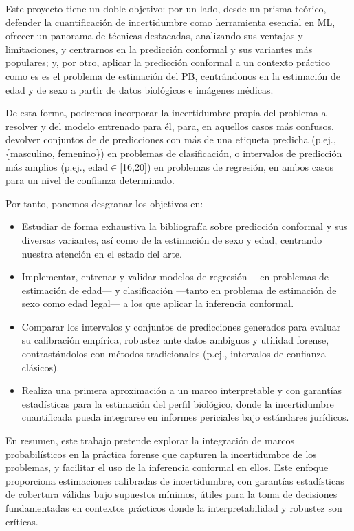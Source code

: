Este proyecto tiene un doble objetivo: por un lado, desde un prisma teórico, defender la cuantificación de
incertidumbre como herramienta esencial en ML, ofrecer un panorama de técnicas destacadas, analizando sus
ventajas y limitaciones, y centrarnos en la predicción conformal y sus variantes más populares; y, 
por otro, aplicar la predicción conformal a un contexto práctico como es es el problema de estimación del PB, 
centrándonos en la estimación de edad y de sexo a partir de datos biológicos e imágenes médicas. 

De esta forma, podremos incorporar la incertidumbre propia del problema a resolver y del modelo entrenado para 
él, para, en aquellos casos más confusos, devolver conjuntos de de predicciones con más de una etiqueta 
predicha (p.ej., \{masculino, femenino\}) en problemas de clasificación, o intervalos de predicción más 
amplios (p.ej., edad$\in$[16,20]) en problemas de regresión, en ambos casos para un nivel de confianza 
determinado.

Por tanto, ponemos desgranar los objetivos en:

\begin{itemize}

    \item Estudiar de forma exhaustiva la bibliografía sobre predicción conformal y sus diversas 
    variantes, así como de la estimación de sexo y edad, centrando nuestra atención en el estado del arte.

    \item Implementar, entrenar y validar modelos de regresión ---en problemas de estimación de edad--- y 
    clasificación ---tanto en problema de estimación de sexo como edad legal--- a los que aplicar la 
    inferencia conformal.

    \item Comparar los intervalos y conjuntos de predicciones generados para evaluar su calibración empírica, 
    robustez ante datos ambiguos y utilidad forense, contrastándolos con métodos tradicionales (p.ej., 
    intervalos de confianza clásicos).  

    \item Realiza una primera aproximación a un marco interpretable y con garantías estadísticas para la 
    estimación del perfil biológico, donde la incertidumbre cuantificada pueda integrarse en informes 
    periciales bajo estándares jurídicos.

\end{itemize}

En resumen, este trabajo pretende explorar la integración de marcos probabilísticos en la práctica forense
que capturen la incertidumbre de los problemas, y facilitar el uso de la inferencia conformal en ellos. 
Este enfoque proporciona estimaciones calibradas de incertidumbre, con garantías estadísticas de cobertura 
válidas bajo supuestos mínimos, útiles para la toma de decisiones fundamentadas en contextos prácticos 
donde la interpretabilidad y robustez son críticas.

